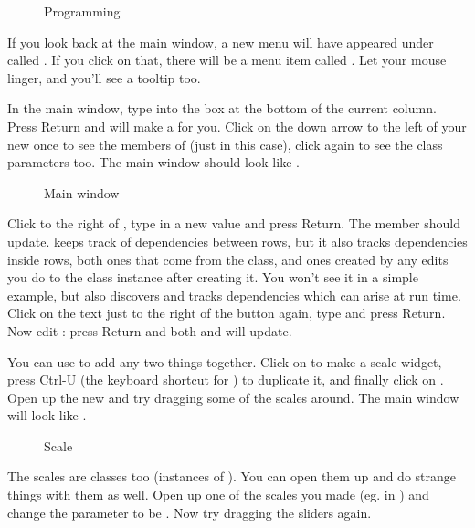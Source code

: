 \begin{figure}
\caption{Programming }
\end{figure}

If you look back at the main \nip{} window, a new menu will have appeared
under  called . If you click on that, there will
be a menu item called . Let your mouse linger, and you'll see a
tooltip too.

In the main window, type  into the box at the bottom of the
current column. Press Return and \nip{} will make a  for you. Click
on the down arrow to the left of your new  once to see the members
of  (just  in this case), click again to see the class
parameters too. The main window should look like .

\begin{figure}
\caption{Main window }
\end{figure}

Click to the right of , type in a new value and press Return. The
 member should update. \nip{} keeps track of dependencies between
rows, but it also tracks dependencies inside rows, both ones that come
from the class, and ones created by any edits you do to the class instance
after creating it. You won't see it in a simple example, but \nip{} also
discovers and tracks dependencies which can arise at run time.  Click on
the text just to the right of the  button again, type  and
press Return. Now edit : press Return and both  and 
will update.

You can use  to add any two things together. Click on
 to make a scale widget, press Ctrl-U
(the keyboard shortcut for ) to duplicate it, and
finally click on . Open up the new
 and try dragging some of the scales around. The main window will
look like .

\begin{figure}
\caption{Scale }
\end{figure}

The scales are classes too (instances of ). You can open them up
and do strange things with them as well. Open up one of the scales you made
(eg.  in ) and change the  parameter to
be . Now try dragging the sliders again.

